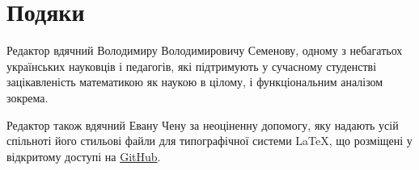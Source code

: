 \section*{Подяки}

Редактор вдячний Володимиру Володимировичу Семенову,
одному з небагатьох українських науковців і педагогів,
які підтримують у сучасному студенстві
зацікавленість математикою як наукою в цілому,
і функціональним аналізом зокрема.

Редактор також вдячний Евану Чену за неоціненну допомогу,
яку надають усій спільноті його стильові файли
для типографічної системи \LaTeX,
що розміщені у відкритому доступі на \href{https://github.com/vEnhance/dotfiles/blob/master/texmf/tex/latex/evan/evan.sty}{GitHub}.
